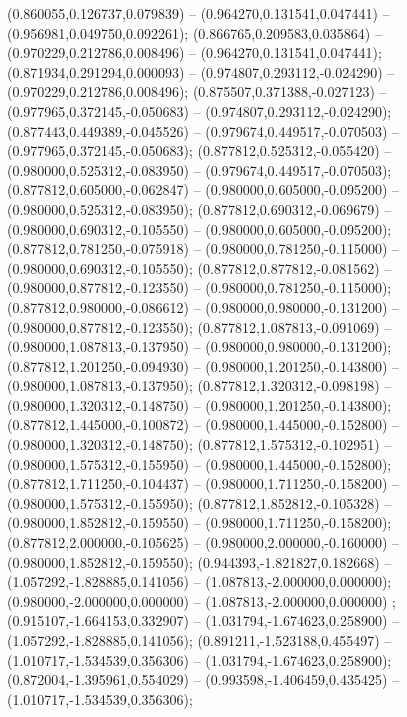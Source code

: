  (0.860055,0.126737,0.079839) -- (0.964270,0.131541,0.047441) -- (0.956981,0.049750,0.092261);
 (0.866765,0.209583,0.035864) -- (0.970229,0.212786,0.008496) -- (0.964270,0.131541,0.047441);
 (0.871934,0.291294,0.000093) -- (0.974807,0.293112,-0.024290) -- (0.970229,0.212786,0.008496);
 (0.875507,0.371388,-0.027123) -- (0.977965,0.372145,-0.050683) -- (0.974807,0.293112,-0.024290);
 (0.877443,0.449389,-0.045526) -- (0.979674,0.449517,-0.070503) -- (0.977965,0.372145,-0.050683);
 (0.877812,0.525312,-0.055420) -- (0.980000,0.525312,-0.083950) -- (0.979674,0.449517,-0.070503);
 (0.877812,0.605000,-0.062847) -- (0.980000,0.605000,-0.095200) -- (0.980000,0.525312,-0.083950);
 (0.877812,0.690312,-0.069679) -- (0.980000,0.690312,-0.105550) -- (0.980000,0.605000,-0.095200);
 (0.877812,0.781250,-0.075918) -- (0.980000,0.781250,-0.115000) -- (0.980000,0.690312,-0.105550);
 (0.877812,0.877812,-0.081562) -- (0.980000,0.877812,-0.123550) -- (0.980000,0.781250,-0.115000);
 (0.877812,0.980000,-0.086612) -- (0.980000,0.980000,-0.131200) -- (0.980000,0.877812,-0.123550);
 (0.877812,1.087813,-0.091069) -- (0.980000,1.087813,-0.137950) -- (0.980000,0.980000,-0.131200);
 (0.877812,1.201250,-0.094930) -- (0.980000,1.201250,-0.143800) -- (0.980000,1.087813,-0.137950);
 (0.877812,1.320312,-0.098198) -- (0.980000,1.320312,-0.148750) -- (0.980000,1.201250,-0.143800);
 (0.877812,1.445000,-0.100872) -- (0.980000,1.445000,-0.152800) -- (0.980000,1.320312,-0.148750);
 (0.877812,1.575312,-0.102951) -- (0.980000,1.575312,-0.155950) -- (0.980000,1.445000,-0.152800);
 (0.877812,1.711250,-0.104437) -- (0.980000,1.711250,-0.158200) -- (0.980000,1.575312,-0.155950);
 (0.877812,1.852812,-0.105328) -- (0.980000,1.852812,-0.159550) -- (0.980000,1.711250,-0.158200);
 (0.877812,2.000000,-0.105625) -- (0.980000,2.000000,-0.160000) -- (0.980000,1.852812,-0.159550);
 (0.944393,-1.821827,0.182668) -- (1.057292,-1.828885,0.141056) -- (1.087813,-2.000000,0.000000);
 (0.980000,-2.000000,0.000000) -- (1.087813,-2.000000,0.000000) ;
 (0.915107,-1.664153,0.332907) -- (1.031794,-1.674623,0.258900) -- (1.057292,-1.828885,0.141056);
 (0.891211,-1.523188,0.455497) -- (1.010717,-1.534539,0.356306) -- (1.031794,-1.674623,0.258900);
 (0.872004,-1.395961,0.554029) -- (0.993598,-1.406459,0.435425) -- (1.010717,-1.534539,0.356306);
